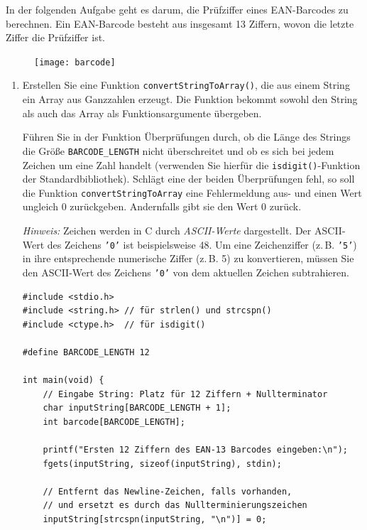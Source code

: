 \vspace{10pt}

In der folgenden Aufgabe geht es darum, die Prüfziffer eines EAN-Barcodes zu
berechnen. Ein EAN-Barcode besteht aus insgesamt 13 Ziffern, wovon die letzte
Ziffer die Prüfziffer ist.

\begin{figure}[htb!]
\centering
\texttt{[image: barcode]}
\end{figure}

\begin{enumerate}

\item Erstellen Sie eine Funktion \texttt{convertStringToArray()}, die
aus einem String ein Array aus Ganzzahlen erzeugt. Die Funktion bekommt sowohl
den String als auch das Array als Funktionsargumente übergeben.

Führen Sie in der Funktion Überprüfungen durch, ob die Länge des Strings die
Größe \texttt{BARCODE_LENGTH} nicht überschreitet und ob es sich bei
jedem Zeichen um eine Zahl handelt (verwenden Sie hierfür die
\texttt{isdigit()}-Funktion der Standardbibliothek). Schlägt eine der
beiden Überprüfungen fehl, so soll die Funktion
\texttt{convertStringToArray} eine Fehlermeldung aus- und einen Wert
ungleich 0 zurückgeben. Andernfalls gibt sie den Wert 0 zurück.

\textit{Hinweis:} Zeichen werden in C durch \textit{ASCII-Werte} dargestellt.
Der ASCII-Wert des Zeichens \texttt{'0'} ist beispielsweise 48. Um eine
Zeichenziffer (z.\,B. \texttt{'5'}) in ihre entsprechende numerische Ziffer
(z.\,B. 5) zu konvertieren, müssen Sie den ASCII-Wert des Zeichens \texttt{'0'}
von dem aktuellen Zeichen subtrahieren.

\pagebreak

\Vorlage
\begin{verbatim}
#include <stdio.h>
#include <string.h> // für strlen() und strcspn()
#include <ctype.h>  // für isdigit()

#define BARCODE_LENGTH 12

int main(void) {
    // Eingabe String: Platz für 12 Ziffern + Nullterminator
    char inputString[BARCODE_LENGTH + 1];
    int barcode[BARCODE_LENGTH];

    printf("Ersten 12 Ziffern des EAN-13 Barcodes eingeben:\n");
    fgets(inputString, sizeof(inputString), stdin);

    // Entfernt das Newline-Zeichen, falls vorhanden,
    // und ersetzt es durch das Nullterminierungszeichen
    inputString[strcspn(inputString, "\n")] = 0;



\end{verbatim}
\end{enumerate}
